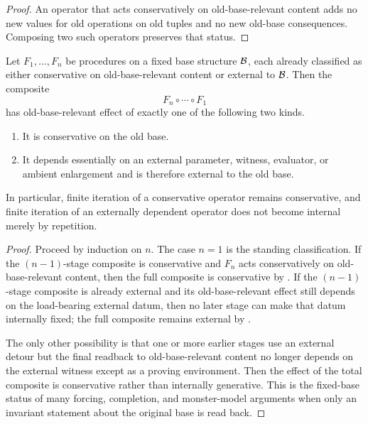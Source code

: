 \begin{proof}
An operator that acts conservatively on old-base-relevant content adds no new values for old operations on old tuples and no new old-base consequences. Composing two such operators preserves that status.
\end{proof}

\begin{theorem}\label{thm:composition-iteration}
Let $F_1,\dots,F_n$ be procedures on a fixed base structure $\mathcal{B}$, each already classified as either conservative on old-base-relevant content or external to $\mathcal{B}$. Then the composite
\[
F_n\circ\cdots\circ F_1
\]
has old-base-relevant effect of exactly one of the following two kinds.
\begin{enumerate}[label=(\alph*)]
    \item It is conservative on the old base.
    \item It depends essentially on an external parameter, witness, evaluator, or ambient enlargement and is therefore external to the old base.
\end{enumerate}
In particular, finite iteration of a conservative operator remains conservative, and finite iteration of an externally dependent operator does not become internal merely by repetition.
\end{theorem}

\begin{proof}
Proceed by induction on $n$. The case $n=1$ is the standing classification. If the $(n-1)$-stage composite is conservative and $F_n$ acts conservatively on old-base-relevant content, then the full composite is conservative by . If the $(n-1)$-stage composite is already external and its old-base-relevant effect still depends on the load-bearing external datum, then no later stage can make that datum internally fixed; the full composite remains external by .

The only other possibility is that one or more earlier stages use an external detour but the final readback to old-base-relevant content no longer depends on the external witness except as a proving environment. Then the effect of the total composite is conservative rather than internally generative. This is the fixed-base status of many forcing, completion, and monster-model arguments when only an invariant statement about the original base is read back.
\end{proof}

